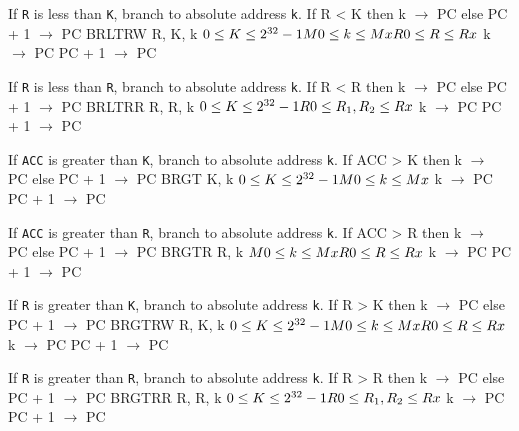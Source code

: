 \documentclass[titlepage]{scrartcl}
\begin{document}
{If \texttt{R} is less than \texttt{K}, branch to absolute address \texttt{k}.}
{If R < K then k $\rightarrow$ PC else PC + 1 $\rightarrow$ PC}
{BRLTRW R, K, k}
{$0 \leq K \leq 2^{32} - 1 \hfill \break M0 \leq k \leq Mx \hfill \break R0 \leq R \leq Rx$}
{k $\rightarrow$ PC \hfill \break PC + 1 $\rightarrow$ PC}
{}
{\srtable{}{}{}{}}

{If \texttt{R} is less than \texttt{R}, branch to absolute address \texttt{k}.}
{If R < R then k $\rightarrow$ PC else PC + 1 $\rightarrow$ PC}
{BRLTRR R, R, k}
{$0 \leq K \leq 2^{32} - 1 \hfill \break R0 \leq R_{1}, R_{2} \leq Rx$}
{k $\rightarrow$ PC \hfill \break PC + 1 $\rightarrow$ PC}
{}
{\srtable{}{}{}{}}

{If \texttt{ACC} is greater than \texttt{K}, branch to absolute address \texttt{k}.}
{If ACC > K then k $\rightarrow$ PC else PC + 1 $\rightarrow$ PC}
{BRGT K, k}
{$0 \leq K \leq 2^{32} - 1 \hfill \break M0 \leq k \leq Mx$}
{k $\rightarrow$ PC \hfill \break PC + 1 $\rightarrow$ PC}
{}
{\srtable{}{}{}{}}

{If \texttt{ACC} is greater than \texttt{R}, branch to absolute address \texttt{k}.}
{If ACC > R then k $\rightarrow$ PC else PC + 1 $\rightarrow$ PC}
{BRGTR R, k}
{$M0 \leq k \leq Mx \hfill \break R0 \leq R \leq Rx$}
{k $\rightarrow$ PC \hfill \break PC + 1 $\rightarrow$ PC}
{}
{\srtable{}{}{}{}}

{If \texttt{R} is greater than \texttt{K}, branch to absolute address \texttt{k}.}
{If R > K then k $\rightarrow$ PC else PC + 1 $\rightarrow$ PC}
{BRGTRW R, K, k}
{$0 \leq K \leq 2^{32} - 1 \hfill \break M0 \leq k \leq Mx \hfill \break R0 \leq R \leq Rx$}
{k $\rightarrow$ PC \hfill \break PC + 1 $\rightarrow$ PC}
{}
{\srtable{}{}{}{}}

{If \texttt{R} is greater than \texttt{R}, branch to absolute address \texttt{k}.}
{If R > R then k $\rightarrow$ PC else PC + 1 $\rightarrow$ PC}
{BRGTRR R, R, k}
{$0 \leq K \leq 2^{32} - 1 \hfill \break R0 \leq R_{1}, R_{2} \leq Rx$}
{k $\rightarrow$ PC \hfill \break PC + 1 $\rightarrow$ PC}
{}
{\srtable{}{}{}{}}
\end{document}
